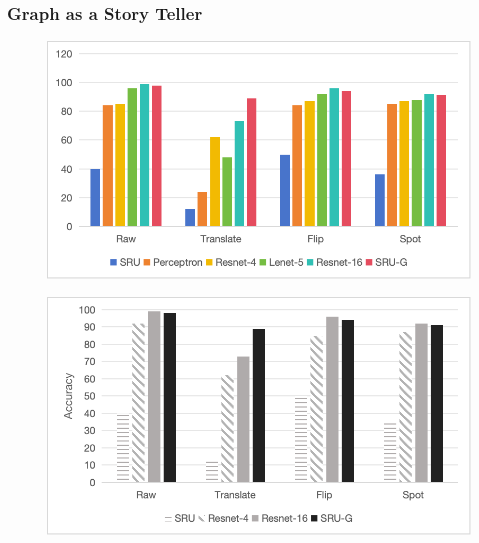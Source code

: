 \documentclass{beamer}
\begin{document}
    \begin{frame}
        \frametitle{Graph as a Story Teller}
        \begin{minipage}{0.48\textwidth}
            \begin{figure}
                \centering
                \includegraphics[width=\textwidth]{fig-2.png}
            \end{figure}
        \end{minipage}
        \hfill
        \begin{minipage}{0.48\textwidth}
            \begin{figure}
                \centering
                \includegraphics[width=\textwidth]{fig-3.png}
            \end{figure}
        \end{minipage}
    \end{frame}
    
\end{document}
